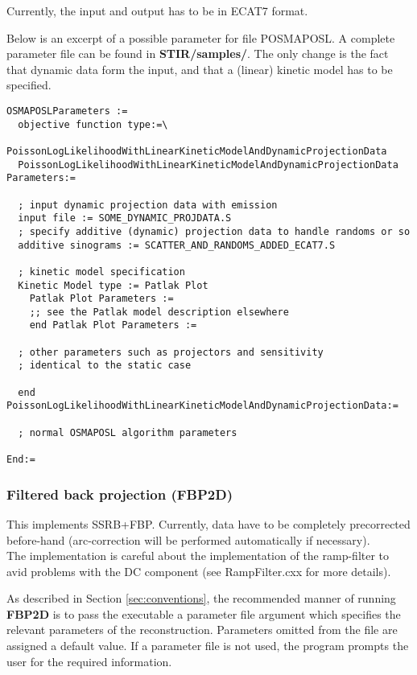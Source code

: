 \documentclass{article}
\begin{document}
Currently, the input and output has to be in ECAT7 format. 

Below is an excerpt of a possible parameter for file POSMAPOSL. A complete parameter file
can be found in \textbf{STIR/samples/}. The only change is the fact that dynamic data
form the input, and that a (linear) kinetic model has to be specified.

\begin{verbatim}
OSMAPOSLParameters :=
  objective function type:=\
     PoissonLogLikelihoodWithLinearKineticModelAndDynamicProjectionData
  PoissonLogLikelihoodWithLinearKineticModelAndDynamicProjectionData Parameters:=

  ; input dynamic projection data with emission
  input file := SOME_DYNAMIC_PROJDATA.S
  ; specify additive (dynamic) projection data to handle randoms or so
  additive sinograms := SCATTER_AND_RANDOMS_ADDED_ECAT7.S

  ; kinetic model specification
  Kinetic Model type := Patlak Plot
    Patlak Plot Parameters :=
    ;; see the Patlak model description elsewhere
    end Patlak Plot Parameters :=

  ; other parameters such as projectors and sensitivity 
  ; identical to the static case

  end PoissonLogLikelihoodWithLinearKineticModelAndDynamicProjectionData:=

  ; normal OSMAPOSL algorithm parameters 

End:=
\end{verbatim}

\subsubsection{
Filtered back projection (FBP2D)}

This implements SSRB+FBP. Currently, data have to be completely 
precorrected before-hand (arc-correction will be performed automatically
if necessary).\\
The implementation is careful about the implementation of the 
ramp-filter to avid problems with the DC component (see RampFilter.cxx 
for more details).



As described in Section \ref{sec:conventions}, the recommended manner of running \textbf{FBP2D}  
is to pass the executable a parameter file argument which specifies 
the relevant parameters of the reconstruction. Parameters omitted 
from the file are assigned a default value. If a parameter file 
is not used, the program prompts the user for the required information.
\end{document}
